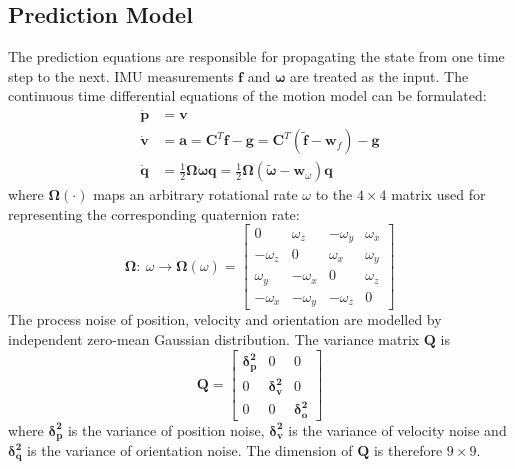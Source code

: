 \documentclass[letterpaper, 10 pt, conference]{ieeeconf}  %
\begin{document}
\subsection{Prediction Model}
The prediction equations are responsible for propagating the state from one time step to the next. IMU measurements $\bm{f}$ and $\bm{\omega}$ are treated as the input. The continuous time differential equations of the motion model can be formulated:
\begin{equation}
\begin{split}
\bm{\dot{p}} &= \bm{v}   \\
\bm{\dot{v}} &= \bm{a} =\bm{C}^T\bm{f}-\bm{g} = \bm{C}^T(\bm{\tilde{f}}-\bm{w}_f)-\bm{g}  \\
\bm{\dot{q}} &=\frac{1}{2}\bm{\Omega}\bm{\omega}\bm{q}   =\frac{1}{2}\bm{\Omega}(\bm{\tilde{\omega}}-\bm{w}_{\omega})\bm{q}  
\end{split}
\end{equation} 
where $\bm{\Omega}(\cdot)$ maps an arbitrary rotational rate $\omega$ to the $4\times 4$ matrix used for representing the corresponding quaternion rate:
\begin{equation}
\bm{\Omega}:~\omega\rightarrow \bm{\Omega}(\omega)=\begin{bmatrix}
0  			&\omega_z  		 &-\omega_y  	 &\omega_x  \\
-\omega_z   &0               & \omega_x      &\omega_y  \\
\omega_y    &-\omega_x       & 0             &\omega_z  \\
-\omega_x   &-\omega_y       &-\omega_z      &  0
\end{bmatrix}
\end{equation}
The process noise of position, velocity and orientation are modelled by independent zero-mean Gaussian distribution. The variance matrix $\bm{Q}$ is 
\begin{equation}
\renewcommand\arraystretch{1.3}
\bm{Q}=\begin{bmatrix}
\bm{\delta^2_p}     &0              	 &0    \\
0              		&\bm{\delta^2_v}     &0    \\
0              		&0              	 &\bm{\delta^2_o}   
\end{bmatrix}
\end{equation}
where $\bm{\delta^2_p}$ is the variance of position noise, $\bm{\delta^2_v}$ is the variance of velocity noise and $\bm{\delta^2_q}$ is the variance of orientation noise. The dimension of $\bm{Q}$ is therefore $9\times 9$. 
\end{document}
